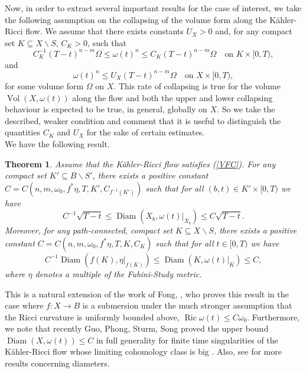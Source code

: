\documentclass[12pt]{article}
\newtheorem{theorem}{Theorem}[section]
\numberwithin{equation}{section}
\DeclareMathOperator{\Ric}{Ric}
\DeclareMathOperator{\Vol}{Vol}
\DeclareMathOperator{\Diam}{Diam}
\begin{document}
\noindent Now, in order to extract several important results for the case of interest, we take the following assumption on the collapsing of the volume form along the K\"ahler-Ricci flow. We assume that there exists constants $U_X > 0$ and, for any compact set $K \subseteq X \backslash S$, $C_K > 0$, such that
\begin{equation}\tag{VFC}
    C_K^{-1} (T-t)^{n-m} \Omega \leq \omega(t)^n \leq C_K(T-t)^{n-m} \Omega \quad \text{on } K \times [0,T),
\end{equation}
and
\begin{equation*}
    \omega(t)^n \leq U_X (T-t)^{n-m} \Omega \quad \text{on } X \times [0,T),
\end{equation*}
for some volume form $\Omega$ on $X$. This rate of collapsing is true for the volume $\Vol(X,\omega(t))$ along the flow and both the upper and lower collapsing behaviour is expected to be true, in general, globally on $X$. So we take the described, weaker condition and comment that it is useful to distinguish the quantities $C_K$ and $U_X$ for the sake of certain estimates.\\

\noindent We have the following result.

\begin{theorem}
Assume that the K\"ahler-Ricci flow satisfies (\ref{VFC}). For any compact set $K' \subseteq B\backslash S'$, there exists a positive constant $C = C(n,m,\omega_0,f^*\eta,T, K', C_{f^{-1}(K')})$ such that for all $(b,t) \in K' \times[0,T)$ we have
\begin{equation*}
     C^{-1} \sqrt{T-t} \leq \Diam(X_b, \omega(t)|_{X_b}) \leq C \sqrt{T-t}.
\end{equation*}
Moreover, for any path-connected, compact set $K \subseteq X \backslash S$, there exists a positive constant $C = C(n,m,\omega_0,f^*\eta,T,K,C_K)$ such that for all $t\in [0,T)$ we have
\begin{equation*}
    C^{-1}\Diam(f(K),\eta|_{f(K)}) \leq \Diam(K, \omega(t)|_K) \leq C,
\end{equation*}
where $\eta$ denotes a multiple of the Fubini-Study metric.
\end{theorem}


\noindent This is a natural extension of the work of Fong, \cite{F15}, who proves this result in the case where $f: X \to B$ is a submersion under the much stronger assumption that the Ricci curvature is uniformly bounded above, $\Ric \omega(t) \leq C \omega_0$. Furthermore, we note that recently Guo, Phong, Sturm, Song proved the upper bound $\Diam(X, \omega(t)) \leq C$ in full generality for finite time singularities of the K\"ahler-Ricci flow whose limiting cohomology class is big \cite{GPSS24}. Also, see \cite{FZ16,S21,SSW12,ZZ23} for more results concerning diameters.\\
\end{document}
